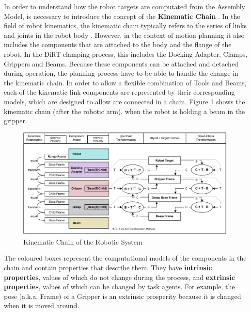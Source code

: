 In order to understand how the robot targets are computated from the Assembly Model, is necessary to introduce the concept of the \textbf{Kinematic Chain} \parencite{lavallePlanningAlgorithms2006}. In the field of robot kinematics, the kinematic chain typically refers to the series of links and joints in the robot body \parencite{waldronKinematics2016}. However, in the context of motion planning it also includes the components that are attached to the body and the flange of the robot. In the DiRT clamping process, this includes the Docking Adapter, Clamps, Grippers and Beams. Because these components can be attached and detached during operation, the planning process have to be able to handle the change in the kinematic chain.
In order to allow a flexible combination of Tools and Beams, each of the kinematic link components are represented by their corresponding models, which are designed to allow are connected in a chain. Figure \ref{fig:kinematic-chain-of-the-robotic-system} shows the kinematic chain (after the robotic arm), when the robot is holding a beam in the gripper.

\begin{figure}[!h]
    \centering
    \includegraphics[width=0.99\textwidth]{images/6a/robot-frame-propagation.pdf}
    \caption{Kinematic Chain of the Robotic System}
    \label{fig:kinematic-chain-of-the-robotic-system}
\end{figure}

The coloured boxes represent the computational models of the components in the chain and contain properties that describe them. They have \textbf{intrinsic properties}, values of which do not change during the process, and \textbf{extrinsic properties}, values of which can be changed by task agents. For example, the pose (a.k.a. Frame) of a Gripper is an extrinsic prosperity because it is changed when it is moved around.


